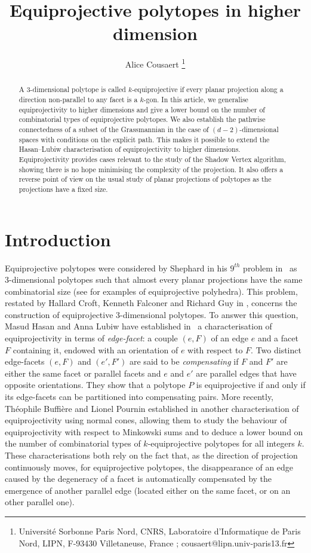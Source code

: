 \documentclass[12pt, notitlepage]{article}
\title{Equiprojective polytopes in higher dimension}
\author{Alice Cousaert \thanks{Université Sorbonne Paris Nord, CNRS, Laboratoire d'Informatique de Paris Nord, LIPN, F-93430 Villetaneuse, France ; cousaert@lipn.univ-paris13.fr} }
\date{}
\theoremstyle{plain}
\theoremstyle{definition}
\theoremstyle{plain}
\theoremstyle{remark}
\theoremstyle{plain}
\theoremstyle{plain}
\begin{document}
\maketitle

\begin{abstract}
    A 3-dimensional polytope is called $k$-equiprojective if every planar projection along a direction non-parallel to any facet is a $k$-gon. In this article, we generalise equiprojectivity to higher dimensions and give a lower bound on the number of combinatorial types of equiprojective polytopes. We also establish the pathwise connectedness of a subset of the Grassmannian in the case of $(d-2)$-dimensional spaces with conditions on the explicit path. This makes it possible to extend the Hasan--Lubiw characterisation of equiprojectivity to higher dimensions. Equiprojectivity provides cases relevant to the study of the Shadow Vertex algorithm, showing there is no hope minimising the complexity of the projection. It also offers a reverse point of view on the usual study of planar projections of polytopes as the projections have a fixed size.
\end{abstract}

\section{Introduction}

Equiprojective polytopes were considered by Shephard in his $9^{th}$ problem in~\cite{SHEPH} as 3\nobreakdash-dimensional polytopes such that almost every planar projections have the same combinatorial size (see \cite{MH} for examples of equiprojective polyhedra). This problem, restated by Hallard Croft, Kenneth Falconer and Richard Guy in \cite{Pb_in_geom}, concerns the construction of equiprojective 3\nobreakdash-dimensional polytopes. To answer this question, Masud Hasan and Anna Lubiw have established in~\cite{MHAL} a characterisation of equiprojectivity in terms of \emph{edge-facet}: a couple $(e,F)$ of an edge $e$ and a facet $F$ containing it, endowed with an orientation of $e$ with respect to $F$. Two distinct edge-facets $(e,F)$ and $(e',F')$ are said to be \emph{compensating} if $F$ and $F'$ are either the same facet or parallel facets and $e$ and $e'$ are parallel edges that have opposite orientations. They show that a polytope $P$ is equiprojective if and only if its edge-facets can be partitioned into compensating pairs. More recently, Théophile Buffière and Lionel Pournin established in \cite{TBLP} another characterisation of equiprojectivity using normal cones, allowing them to study the behaviour of equiprojectivity with respect to Minkowski sums and to deduce a lower bound on the number of combinatorial types of $k$-equiprojective polytopes for all integers $k$. These characterisations both rely on the fact that, as the direction of projection continuously moves, for equiprojective polytopes, the disappearance of an edge caused by the degeneracy of a facet is automatically compensated by the emergence of another parallel edge (located either on the same facet, or on an other parallel one).
\end{document}
